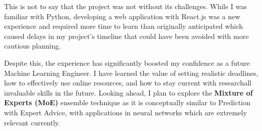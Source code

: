 This is not to say that the project was not without its challenges. While I was familiar with Python, developing a web application with React.js was a new experience and required more time to learn than originally anticipated which caused delays in my project's timeline that could have been avoided with more cautious planning.

Despite this, the experience has significantly boosted my confidence as a future Machine Learning Engineer. I have learned the value of setting realistic deadlines, how to effectively use online resources, and how to stay current with research\textemdash{}all invaluable skills in the future. Looking ahead, I plan to explore the \textbf{Mixture of Experts (MoE)} ensemble technique as it is conceptually similar to Prediction with Expert Advice, with applications in neural networks which are extremely relevant currently.